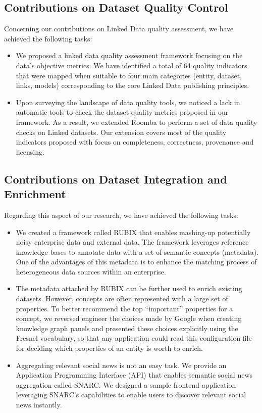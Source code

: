 \documentclass[a4paper,11pt,twoside]{ThesisStyle}
\begin{document}
\subsection{Contributions on Dataset Quality Control}
Concerning our contributions on Linked Data quality assessment, we have achieved the following tasks:
\begin{itemize}
	\item We proposed a linked data quality assessment framework focusing on the data's objective metrics. We have identified a total of 64 quality indicators that were mapped when suitable to four main categories (entity, dataset, links, models) corresponding to the core Linked Data publishing principles.
	\item Upon surveying the landscape of data quality tools, we noticed a lack in automatic tools to check the dataset quality metrics proposed in our framework. As a result, we extended Roomba to perform a set of data quality checks on Linked datasets. Our extension covers most of the quality indicators proposed with focus on completeness, correctness, provenance and licensing.
\end{itemize}

\subsection{Contributions on Dataset Integration and Enrichment}

Regarding this aspect of our research, we have achieved the following tasks:
\begin{itemize}
	\item We created a framework called RUBIX that enables mashing-up potentially noisy enterprise data and external data. The framework leverages reference knowledge bases to annotate data with a set of semantic concepts (metadata). One of the advantages of this metadata is to enhance the matching process of heterogeneous data sources within an enterprise.
	\item The metadata attached by RUBIX can be further used to enrich existing datasets. However, concepts are often represented with a large set of properties. To better recommend the top ``important'' properties for a concept, we reversed engineer the choices made by Google when creating knowledge graph panels and presented these choices explicitly using the Fresnel vocabulary, so that any application could read this configuration file for deciding which properties of an entity is worth to enrich.
	\item Aggregating relevant social news is not an easy task. We provide an Application Programming Interface (API) that enables semantic social news aggregation called SNARC. We designed a sample frontend application leveraging SNARC's capabilities to enable users to discover relevant social news instantly.
\end{itemize}
\end{document}
